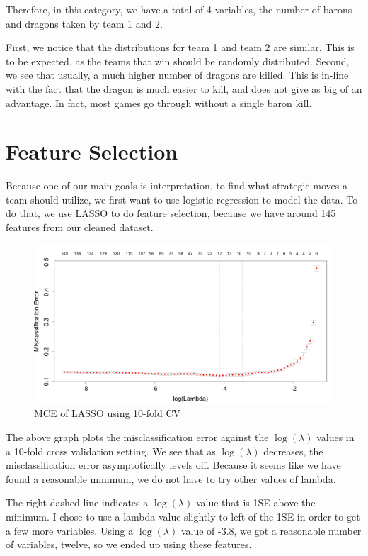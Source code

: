 \documentclass[runningheads]{llncs}
\begin{document}
	Therefore, in this category, we have a total of 4 variables, the number of barons and dragons taken by team 1 and 2.
		
	First, we notice that the distributions for team 1 and team 2 are similar. This is to be expected, as the teams that win should be randomly distributed. Second, we see that usually, a much higher number of dragons are killed. This is in-line with the fact that the dragon is much easier to kill, and does not give as big of an advantage. In fact, most games go through without a single baron kill.
	
	\section{Feature Selection}
	
	Because one of our main goals is interpretation, to find what strategic moves a team should utilize, we first want to use logistic regression to model the data. To do that, we use LASSO to do feature selection, because we have around 145 features from our cleaned dataset.
	
	\begin{figure}[!htb]
		\centering
		\includegraphics[width=\textwidth]{images/lasso.png}
		\caption{MCE of LASSO using 10-fold CV}
	\end{figure}
	
	The above graph plots the misclassification error against the $\log(\lambda)$ values in a 10-fold cross validation setting. We see that as $\log(\lambda)$ decreases, the misclassification error asymptotically levels off. Because it seems like we have found a reasonable minimum, we do not have to try other values of lambda.

	The right dashed line indicates a $\log(\lambda)$ value that is 1SE above the minimum. I chose to use a lambda value slightly to left of the 1SE in order to get a few more variables. Using a $\log(\lambda)$ value of -3.8, we got a reasonable number of variables, twelve, so we ended up using these features.
\end{document}
